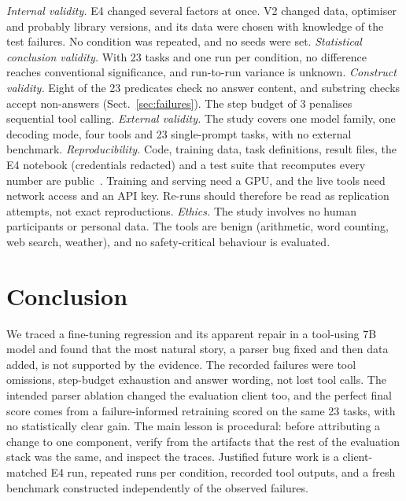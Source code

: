 \documentclass[runningheads]{llncs}
\begin{document}
\emph{Internal validity.} E4 changed several factors at once. V2 changed data, optimiser and probably library versions, and its data were chosen with knowledge of the test failures. No condition was repeated, and no seeds were set. \emph{Statistical conclusion validity.} With 23 tasks and one run per condition, no difference reaches conventional significance, and run-to-run variance is unknown. \emph{Construct validity.} Eight of the 23 predicates check no answer content, and substring checks accept non-answers (Sect.~\ref{sec:failures}). The step budget of 3 penalises sequential tool calling. \emph{External validity.} The study covers one model family, one decoding mode, four tools and 23 single-prompt tasks, with no external benchmark. \emph{Reproducibility.} Code, training data, task definitions, result files, the E4 notebook (credentials redacted) and a test suite that recomputes every number are public~\cite{l2026agentrunrepo}. Training and serving need a GPU, and the live tools need network access and an API key. Re-runs should therefore be read as replication attempts, not exact reproductions. \emph{Ethics.} The study involves no human participants or personal data. The tools are benign (arithmetic, word counting, web search, weather), and no safety-critical behaviour is evaluated.

\section{Conclusion}
\label{sec:conclusion}

We traced a fine-tuning regression and its apparent repair in a tool-using 7B model and found that the most natural story, a parser bug fixed and then data added, is not supported by the evidence. The recorded failures were tool omissions, step-budget exhaustion and answer wording, not lost tool calls. The intended parser ablation changed the evaluation client too, and the perfect final score comes from a failure-informed retraining scored on the same 23 tasks, with no statistically clear gain. The main lesson is procedural: before attributing a change to one component, verify from the artifacts that the rest of the evaluation stack was the same, and inspect the traces. Justified future work is a client-matched E4 run, repeated runs per condition, recorded tool outputs, and a fresh benchmark constructed independently of the observed failures.
\end{document}
